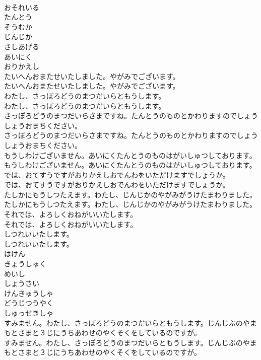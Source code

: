 \documentclass[8pt]{extreport}
\begin{document}
\begin{CJK}{UTF8}{min}
\\	おそれいる
\\	たんとう
\\	そうむか
\\	じんじか
\\	さしあげる
\\	あいにく
\\	おりかえし
\\	たいへんおまたせいたしました。やがみでございます。
\\	たいへんおまたせいたしました。やがみでございます。
\\	わたし、さっぽろどうのまつだいらともうします。
\\	わたし、さっぽろどうのまつだいらともうします。
\\	さっぽろどうのまつだいらさまですね。たんとうのものとかわりますのでしょうしょうおまちください。
\\	さっぽろどうのまつだいらさまですね。たんとうのものとかわりますのでしょうしょうおまちください。
\\	もうしわけございません。あいにくたんとうのものはがいしゅつしております。
\\	もうしわけございません。あいにくたんとうのものはがいしゅつしております。
\\	では、おてすうですがおりかえしおでんわをいただけますでしょうか。
\\	では、おてすうですがおりかえしおでんわをいただけますでしょうか。
\\	たしかにもうしつたえます。わたし、じんじかのやがみがうけたまわりました。
\\	たしかにもうしつたえます。わたし、じんじかのやがみがうけたまわりました。
\\	それでは、よろしくおねがいいたします。
\\	それでは、よろしくおねがいいたします。
\\	しつれいいたします。
\\	しつれいいたします。
\\	はけん
\\	きょうしゅく
\\	めいし
\\	しょうさい
\\	けんきゅうしゃ
\\	どうじつうやく
\\	しゅっせきしゃ
\\	すみません。わたし、さっぽろどうのまつだいらともうします。じんじぶのやまもとさまと３じにうちあわせのやくそくをしているのですが。
\\	すみません。わたし、さっぽろどうのまつだいらともうします。じんじぶのやまもとさまと３じにうちあわせのやくそくをしているのですが。

\end{CJK}
\end{document}
